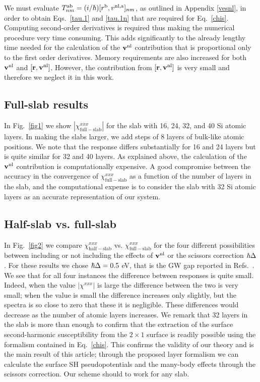 \documentclass[floatfix,prb,aps,superscriptaddress,showpacs,11pt,preprint,letterpaper]{revtex4}
\begin{document}
We must evaluate 
$T^{\mathrm{a}\mathrm{b}}_{nm}=(i/\hbar)[r^{\mathrm{b}},v^{\mathrm{nl},\mathrm{a}}]_{nm}$,
as outlined in Appendix \ref{vesnl},
in order to obtain 
Eqs.~\eqref{tau.1} and \eqref{tau.1n} that are required for 
Eq.~\eqref{chis}.
Computing second-order 
derivatives is required thus making the numerical procedure very 
time consuming. This adds significantly to the already lengthy time needed 
for the calculation of the $\mathbf{v}^{\mathrm{nl}}$ contribution that is
proportional only to 
the first order derivatives. 
Memory requirements are also increased for both $\mathbf{v}^{\mathrm{nl}}$ and 
$[\mathbf{r},\mathbf{v}^{\mathrm{nl}}]$. However, the contribution from $[\mathbf{r},\mathbf{v}^{\mathrm{nl}}]$ 
is very small\cite{valerie} and therefore we neglect it in this work.

\subsection{Full-slab results}\label{fsresults}

In Fig.~\ref{fig1} we show $|\chi_{\mathrm{full-slab}}^{xxx}|$
for the slab with
16, 24, 32, and 40 Si atomic layers. 
In making the slabs larger, we add steps of 8 layers of bulk-like atomic positions. 
We note that the response differs substantially 
for 16 and 24 layers but is quite similar for 32 and 40 layers.
As explained above,
the calculation of the $\mathbf{v}^{\mathrm{nl}}$ contribution is 
computationally expensive.
A good compromise between the accuracy in the convergence of
$\chi^{xxx}_{\mathrm{full-slab}}$ as a function of the number
of layers in the slab, and the computational 
expense is to consider
the slab with 32 Si atomic layers as 
an accurate representation of our 
system.

\subsection{Half-slab vs. full-slab}

In Fig.~\ref{fig2}
we compare 
$\chi^{xxx}_{\mathrm{half-slab}}$  
vs. 
$\chi^{xxx}_{\mathrm{full-slab}}$ 
for the four different possibilities 
between including or not including the
effects of $\mathbf{v}^{\mathrm{nl}}$ or the scissors correction
$\hbar\Delta$.   
For these results we chose
$\hbar\Delta=0.5$ eV, that is the GW gap reported in
Refs.~. 
We see that for all four instances the 
difference between responses is quite small.
Indeed, when the value $|\chi^{xxx}|$ 
is large the difference between the two is very small; 
when the value is small the difference increases only slightly, 
but the spectra is so close to zero that these it is negligible. 
These differences would decrease as the number of atomic layers 
increases. We remark that 32 layers in the slab is more than enough 
to confirm that the extraction of the surface second-harmonic 
susceptibility from the $2\times 1$ surface is readily possible 
using the formalism contained in Eq.~\eqref{chis}.
This confirms the validity of our theory and is the main result of
this article; through the proposed layer formalism we can calculate the surface SH
pseudopotentials
and the many-body effects through the scissors correction.
Our scheme should to work for any slab.  
\end{document}
